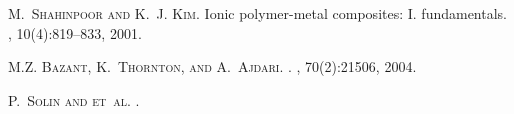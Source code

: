 
\begin{thebibliography}{10}
\textsc{M.~Shahinpoor and K.~J. Kim.}
\newblock Ionic polymer-metal composites: I. fundamentals.
, 10(4):819--833, 2001.

\textsc{M.Z. Bazant, K.~Thornton, and A.~Ajdari.}
.
, 70(2):21506, 2004.

\textsc{P.~Solin and et~al.}
.
\end{thebibliography}
